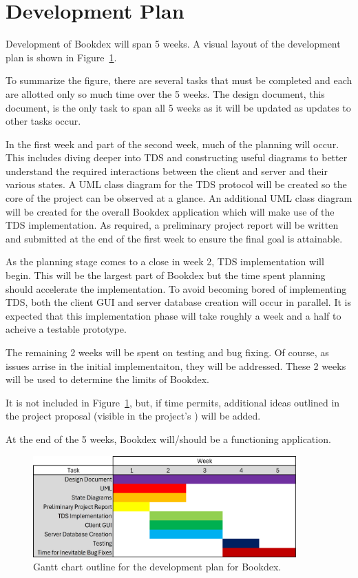 \documentclass[../design_doc.tex]{subfiles}
\begin{document}
\section{Development Plan}\label{sec:plan}
    Development of Bookdex will span 5 weeks. A visual layout of the development plan is shown in Figure~\ref{fig:gantt}.

    To summarize the figure, there are several tasks that must be completed and each are allotted only so much time over the 5 weeks. The design document, this document, is the only task to span all 5 weeks as it will be updated as updates to other tasks occur.

    In the first week and part of the second week, much of the planning will occur. This includes diving deeper into TDS and constructing useful diagrams to better understand the required interactions between the client and server and their various states. A UML class diagram for the TDS protocol will be created so the core of the project can be observed at a glance. An additional UML class diagram will be created for the overall Bookdex application which will make use of the TDS implementation. As required, a preliminary project report will be written and submitted at the end of the first week to ensure the final goal is attainable.

    As the planning stage comes to a close in week 2, TDS implementation will begin. This will be the largest part of Bookdex but the time spent planning should accelerate the implementation. To avoid becoming bored of implementing TDS, both the client GUI and server database creation will occur in parallel. It is expected that this implementation phase will take roughly a week and a half to acheive a testable prototype.

    The remaining 2 weeks will be spent on testing and bug fixing. Of course, as issues arrise in the initial implementaiton, they will be addressed. These 2 weeks will be used to determine the limits of Bookdex.

    It is not included in Figure~\ref{fig:gantt}, but, if time permits, additional ideas outlined in the project proposal (visible in the project's ) will be added.

    At the end of the 5 weeks, Bookdex will/should be a functioning application.

    \begin{figure}[h]
        \centering
        \includegraphics[width=0.9\textwidth]{gantt_chart.png}
        \caption{Gantt chart outline for the development plan for Bookdex.}\label{fig:gantt}
    \end{figure}
\end{document}
